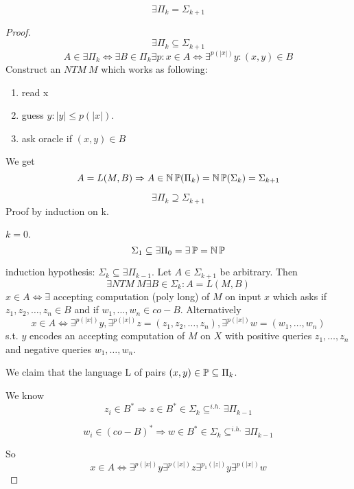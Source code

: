 \begin{theorem}
	\[ \exists \Pi_k = \Sigma_{k + 1} \]
\end{theorem}
\begin{proof}
	\[ \exists \Pi_k \subseteq \Sigma_{k + 1} \]
	\[ A \in \exists \Pi_k \iff \exists B \in \Pi_k \exists p: x \in A \iff \exists^{p(|x|)} y: (x,y) \in B \]
	Construct an $NTM\ M$ which works as following:
	\begin{enumerate}
		\item read x
		\item guess $y: |y| \leq p(|x|)$.
		\item ask oracle if $(x,y) \in B$
	\end{enumerate}

	We get
	\[ A = L(M, B) \Rightarrow A \in \operatorname{\operatorname{\mathbb{N}}\mathbb{P}}(\Pi_k) = \operatorname{\operatorname{\mathbb{N}}\mathbb{P}}(\Sigma_k) = \Sigma_{k + 1} \]

	\[ \exists \Pi_k \supseteq \Sigma_{k + 1} \]
	Proof by induction on k.

	$k = 0$.
	\[ \Sigma_1 \subseteq \exists \Pi_0 = \exists \operatorname{\mathbb{P}} = \operatorname{\operatorname{\mathbb{N}}\mathbb{P}} \]

	induction hypothesis: $\Sigma_k \subseteq \exists \Pi_{k - 1}$.
	Let $A \in \Sigma_{k + 1}$ be arbitrary.
	Then
	\[ \exists NTM\ M \exists B \in \Sigma_k: A = L(M, B) \]
	$x \in A \iff \exists$ accepting computation (poly long) of $M$ on input $x$ which asks if $z_1, z_2, \ldots, z_n \in B$ and if $w_1, \ldots, w_n \in co-B$.
	Alternatively
	\[ x \in A \iff \exists^{p(|x|)} y, \exists^{p(|x|)} z = (z_1, z_2, \ldots, z_n), \exists^{p(|x|)} w = (w_1, \ldots, w_n)\]
	s.t. $y$ encodes an accepting computation of $M$ on $X$ with positive queries $z_1, \ldots, z_n$ and negative queries $w_1, \ldots, w_n$.

	We claim that the language L of pairs $(x, y) \in \operatorname{\mathbb{P}} \subseteq \Pi_k$.

	We know
	\[ z_i \in B^{\ast} \Rightarrow z \in B^{\ast} \in \Sigma_k \subseteq^{i.h.} \exists \Pi_{k - 1}\]

	\[ w_i \in (co-B)^{\ast} \Rightarrow w \in B^{\ast} \in \Sigma_k \subseteq^{i.h.} \exists \Pi_{k - 1}\]

	So
	\[x \in A \iff \exists^{p(|x|)} y \exists^{p(|x|)} z \exists^{p_1(|z|)} y \exists^{p(|x|)} w\]
\end{proof}

